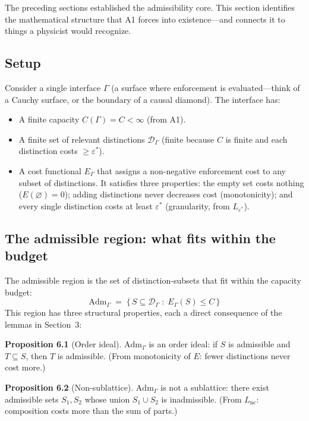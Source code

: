 \documentclass[11pt]{article}
\newcommand{\Adm}{\mathrm{Adm}}
\begin{document}
The preceding sections established the admissibility core.  This section identifies the mathematical structure that A1 forces into existence---and connects it to things a physicist would recognize.

\subsection{Setup}

Consider a single interface $\Gamma$ (a surface where enforcement is evaluated---think of a Cauchy surface, or the boundary of a causal diamond).  The interface has:

\begin{itemize}[nosep]
\item A finite capacity $C(\Gamma) = C < \infty$ (from A1).
\item A finite set of relevant distinctions $\mathcal{D}_\Gamma$ (finite because $C$ is finite and each distinction costs $\ge \varepsilon^*$).
\item A cost functional $E_\Gamma$ that assigns a non-negative enforcement cost to any subset of distinctions.  It satisfies three properties: the empty set costs nothing ($E(\varnothing) = 0$); adding distinctions never decreases cost (monotonicity); and every single distinction costs at least $\varepsilon^*$ (granularity, from $L_{\varepsilon^*}$).
\end{itemize}

\subsection{The admissible region: what fits within the budget}

The admissible region is the set of distinction-subsets that fit within the capacity budget:
\begin{equation}
\Adm_\Gamma \;=\; \bigl\{\, S \subseteq \mathcal{D}_\Gamma \;:\; E_\Gamma(S) \le C \,\bigr\}
\end{equation}
This region has three structural properties, each a direct consequence of the lemmas in Section~3:

\textbf{Proposition 6.1} (Order ideal).  $\Adm_\Gamma$ is an order ideal: if $S$ is admissible and $T \subseteq S$, then $T$ is admissible.  (From monotonicity of $E$: fewer distinctions never cost more.)

\textbf{Proposition 6.2} (Non-sublattice).  $\Adm_\Gamma$ is not a sublattice: there exist admissible sets $S_1, S_2$ whose union $S_1 \cup S_2$ is inadmissible.  (From $L_{\mathrm{nc}}$: composition costs more than the sum of parts.)
\end{document}
